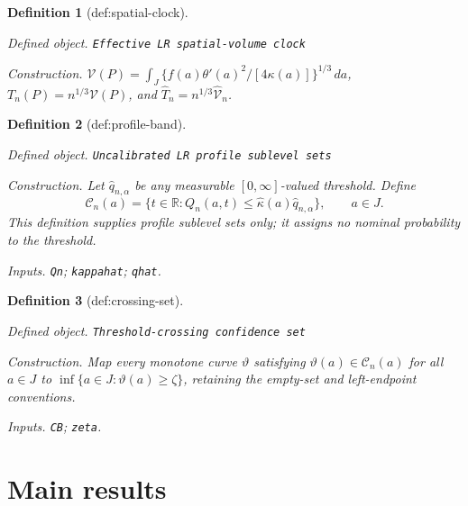 \documentclass{article}
\newtheorem{definition}{Definition}
\begin{document}
\begin{definition}[def:spatial-clock]\label{def:spatial-clock}
\par\smallskip\noindent\emph{Defined object.} \texttt{Effective LR spatial-\allowbreak{}volume clock}
\par\smallskip\noindent\emph{Construction.} \(\mathcal V(P)=\int_J\{f(a)\theta'(a)^2/[4\kappa(a)]\}^{1/3}\,da\), \(T_n(P)=n^{1/3}\mathcal V(P)\), and \(\widehat T_n=n^{1/3}\widehat{\mathcal V}_n\).
\end{definition}

\begin{definition}[def:profile-band]\label{def:profile-band}
\par\smallskip\noindent\emph{Defined object.} \texttt{Uncalibrated LR profile sublevel sets}
\par\smallskip\noindent\emph{Construction.} Let \(\widehat q_{n,\alpha}\) be any measurable \([0,\infty]\)-valued threshold. Define
\[
 \mathcal C_n(a)=\{t\in\mathbb R:Q_n(a,t)\le\widehat\kappa(a)\widehat q_{n,\alpha}\},\qquad a\in J.
\]
This definition supplies profile sublevel sets only; it assigns no nominal probability to the threshold.
\par\smallskip\noindent\emph{Inputs.} \texttt{Qn}; \texttt{kappahat}; \texttt{qhat}.
\end{definition}

\begin{definition}[def:crossing-set]\label{def:crossing-set}
\par\smallskip\noindent\emph{Defined object.} \texttt{Threshold-\allowbreak{}crossing confidence set}
\par\smallskip\noindent\emph{Construction.} Map every monotone curve \(\vartheta\) satisfying \(\vartheta(a)\in\mathcal C_n(a)\) for all \(a\in J\) to \(\inf\{a\in J:\vartheta(a)\ge\zeta\}\), retaining the empty-set and left-endpoint conventions.
\par\smallskip\noindent\emph{Inputs.} \texttt{CB}; \texttt{zeta}.
\end{definition}

\section{Main results}
\end{document}
